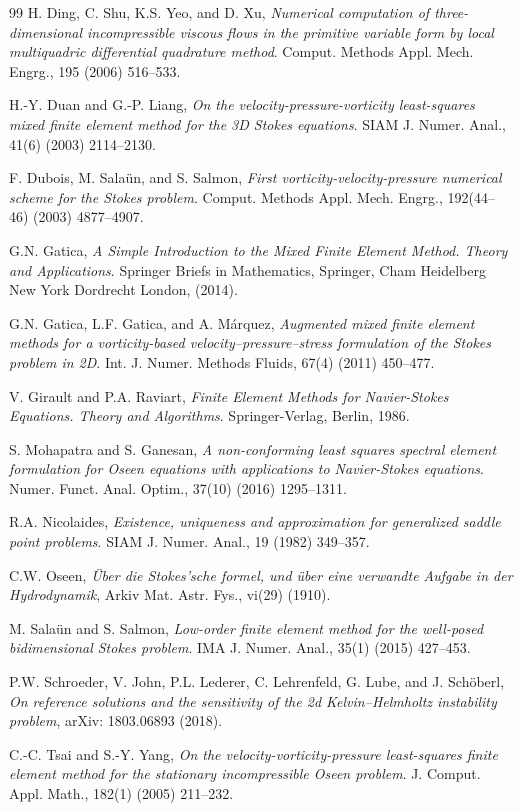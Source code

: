 \documentclass[reqno,a4paper]{article}
\numberwithin{equation}{section}
\begin{document}
\begin{thebibliography}{99}
 {\sc H. Ding, C. Shu, K.S. Yeo, and D. Xu},
{\it Numerical computation of three-dimensional incompressible viscous
flows in the primitive variable form by local multiquadric differential quadrature method}.
Comput. Methods Appl. Mech. Engrg., 195 (2006) 516--533.

 {\sc H.-Y. Duan and G.-P. Liang}, {\it On 
the velocity-pressure-vorticity least-squares mixed finite element method for the 3D Stokes equations}. 
SIAM J. Numer. Anal., 41(6) (2003) 2114--2130.

 {\sc F. Dubois, M. Sala\"un, and S. Salmon}, {\it
  First vorticity-velocity-pressure numerical scheme for the Stokes
  problem}. Comput. Methods Appl. Mech. Engrg., 192(44--46) (2003)
  4877--4907.

{\sc G.N. Gatica}, 
{\it A Simple Introduction to the Mixed Finite Element Method. Theory and Applications}.
Springer Briefs in Mathematics, Springer, Cham Heidelberg New York Dordrecht London, (2014).

 {\sc G.N. Gatica, L.F. Gatica, and A. M\'arquez}, {\it
  Augmented mixed finite element methods for a vorticity-based
  velocity--pressure--stress formulation of the Stokes problem in 2D}.
  Int. J. Numer. Methods Fluids, 67(4) (2011) 450--477.

{\sc V. Girault and P.A. Raviart}, {\it Finite
  Element Methods for Navier-Stokes Equations. Theory and Algorithms}.
  Springer-Verlag, Berlin, 1986.
  
   {\sc S. Mohapatra and S. Ganesan},
  {\it A non-conforming least squares spectral element 
  formulation for Oseen equations with applications to Navier-Stokes equations}. 
 Numer.  Funct. Anal. Optim., 37(10)  (2016) 1295--1311.

 {\sc R.A. Nicolaides}, {\it Existence, uniqueness and 
approximation for generalized saddle point problems}. SIAM J. Numer. Anal., 19 (1982) 349--357.

 {\sc C.W. Oseen}, {\it \"Uber die Stokes'sche formel, und \"uber 
eine verwandte Aufgabe in der Hydrodynamik}, Arkiv Mat. Astr. Fys.,  vi(29) (1910). 
      
 {\sc M. Sala\"un and S. Salmon}, {\it Low-order
    finite element method for the well-posed bidimensional Stokes
    problem}.  IMA J. Numer. Anal., 35(1) (2015) 427--453. 
    
 {\sc P.W. Schroeder, V. John, P.L. Lederer, C. Lehrenfeld, G. Lube, and 
J. Sch\"oberl}, {\it On reference solutions and the sensitivity of the 2d Kelvin--Helmholtz instability problem}, 
arXiv: 1803.06893 (2018). 
    
    
 {\sc C.-C. Tsai and S.-Y. Yang}, {\it On the velocity-vorticity-pressure least-squares 
finite element method for the stationary incompressible Oseen problem}. 
J. Comput. Appl. Math., 182(1) (2005) 211--232. 
    
\end{thebibliography}
\end{document}
